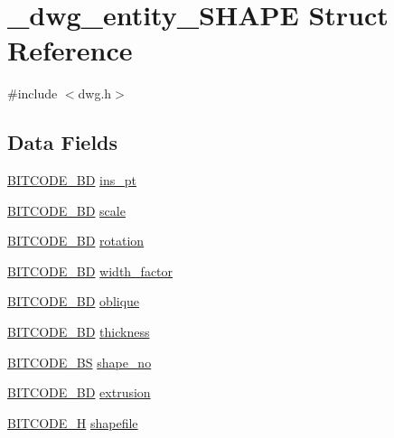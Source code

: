 \hypertarget{struct__dwg__entity__SHAPE}{\section{\-\_\-dwg\-\_\-entity\-\_\-\-S\-H\-A\-P\-E \-Struct \-Reference}
\label{struct__dwg__entity__SHAPE}
}


{\ttfamily \#include $<$dwg.\-h$>$}

\subsection*{\-Data \-Fields}
\begin{DoxyCompactItemize}
\item 
\hyperlink{dwg_8h_a00698ef1bb072aa0a9360c6fc1c57587}{\-B\-I\-T\-C\-O\-D\-E\-\_\-B\-D} \hyperlink{struct__dwg__entity__SHAPE_a8066e9c9d9cd760c0965a7107b5e43df}{ins\-\_\-pt}
\item 
\hyperlink{dwg_8h_a3c1e6781466b74ba07785d57da70ed97}{\-B\-I\-T\-C\-O\-D\-E\-\_\-\-B\-D} \hyperlink{struct__dwg__entity__SHAPE_a249ab007f8a1163f71f010315c9c7245}{scale}
\item 
\hyperlink{dwg_8h_a3c1e6781466b74ba07785d57da70ed97}{\-B\-I\-T\-C\-O\-D\-E\-\_\-\-B\-D} \hyperlink{struct__dwg__entity__SHAPE_a9a15ab784caba6954bf4bff2dff5cdc9}{rotation}
\item 
\hyperlink{dwg_8h_a3c1e6781466b74ba07785d57da70ed97}{\-B\-I\-T\-C\-O\-D\-E\-\_\-\-B\-D} \hyperlink{struct__dwg__entity__SHAPE_a0daa9640fb33c82c444be403a9365d8e}{width\-\_\-factor}
\item 
\hyperlink{dwg_8h_a3c1e6781466b74ba07785d57da70ed97}{\-B\-I\-T\-C\-O\-D\-E\-\_\-\-B\-D} \hyperlink{struct__dwg__entity__SHAPE_af7e79821c893fdbafbfb7952ed063e1e}{oblique}
\item 
\hyperlink{dwg_8h_a3c1e6781466b74ba07785d57da70ed97}{\-B\-I\-T\-C\-O\-D\-E\-\_\-\-B\-D} \hyperlink{struct__dwg__entity__SHAPE_a26024ef56411e125c19fe3d93514c7fa}{thickness}
\item 
\hyperlink{dwg_8h_a94297606fbd4a4ff97e8add284af0809}{\-B\-I\-T\-C\-O\-D\-E\-\_\-\-B\-S} \hyperlink{struct__dwg__entity__SHAPE_a2a3c092ee147806316812bba25a01325}{shape\-\_\-no}
\item 
\hyperlink{dwg_8h_a00698ef1bb072aa0a9360c6fc1c57587}{\-B\-I\-T\-C\-O\-D\-E\-\_\-B\-D} \hyperlink{struct__dwg__entity__SHAPE_a9972983543fb17d80b3b33b6c3fd01ee}{extrusion}
\item 
\hyperlink{dwg_8h_a7c700e94e047a97ba8c24bdfe4029dc3}{\-B\-I\-T\-C\-O\-D\-E\-\_\-\-H} \hyperlink{struct__dwg__entity__SHAPE_a09736e332bbf6f45c0e78c5bd2f93ba8}{shapefile}
\end{DoxyCompactItemize}


